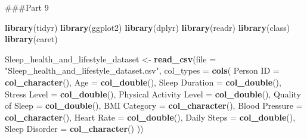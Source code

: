 \documentclass[
  11pt,
]{article}
\newenvironment{Shaded}{\begin{snugshade}}{\end{snugshade}}
\newcommand{\AttributeTok}[1]{\textcolor[rgb]{0.13,0.29,0.53}{#1}}
\newcommand{\FunctionTok}[1]{\textcolor[rgb]{0.13,0.29,0.53}{\textbf{#1}}}
\newcommand{\NormalTok}[1]{#1}
\newcommand{\OtherTok}[1]{\textcolor[rgb]{0.56,0.35,0.01}{#1}}
\newcommand{\StringTok}[1]{\textcolor[rgb]{0.31,0.60,0.02}{#1}}
\begin{document}
\#\#\#Part 9

\begin{Shaded}
\begin{Highlighting}[]
\FunctionTok{library}\NormalTok{(tidyr)}
\FunctionTok{library}\NormalTok{(ggplot2)}
\FunctionTok{library}\NormalTok{(dplyr)}
\FunctionTok{library}\NormalTok{(readr)}
\FunctionTok{library}\NormalTok{(class)}
\FunctionTok{library}\NormalTok{(caret)}

\NormalTok{Sleep\_health\_and\_lifestyle\_dataset }\OtherTok{\textless{}{-}} \FunctionTok{read\_csv}\NormalTok{(}\AttributeTok{file =} \StringTok{"Sleep\_health\_and\_lifestyle\_dataset.csv"}\NormalTok{,}
  \AttributeTok{col\_types =} \FunctionTok{cols}\NormalTok{(}
    \StringTok{\textquotesingle{}Person ID\textquotesingle{}} \OtherTok{=} \FunctionTok{col\_character}\NormalTok{(),}
    \StringTok{\textquotesingle{}Age\textquotesingle{}} \OtherTok{=} \FunctionTok{col\_double}\NormalTok{(),}
    \StringTok{\textquotesingle{}Sleep Duration\textquotesingle{}} \OtherTok{=} \FunctionTok{col\_double}\NormalTok{(),}
    \StringTok{\textquotesingle{}Stress Level\textquotesingle{}} \OtherTok{=} \FunctionTok{col\_double}\NormalTok{(),}
    \StringTok{\textquotesingle{}Physical Activity Level\textquotesingle{}} \OtherTok{=} \FunctionTok{col\_double}\NormalTok{(),}
    \StringTok{\textquotesingle{}Quality of Sleep\textquotesingle{}} \OtherTok{=} \FunctionTok{col\_double}\NormalTok{(),}
    \StringTok{\textquotesingle{}BMI Category\textquotesingle{}} \OtherTok{=} \FunctionTok{col\_character}\NormalTok{(),}
    \StringTok{\textquotesingle{}Blood Pressure\textquotesingle{}} \OtherTok{=} \FunctionTok{col\_character}\NormalTok{(),}
    \StringTok{\textquotesingle{}Heart Rate\textquotesingle{}} \OtherTok{=} \FunctionTok{col\_double}\NormalTok{(),}
    \StringTok{\textquotesingle{}Daily Steps\textquotesingle{}} \OtherTok{=} \FunctionTok{col\_double}\NormalTok{(),}
    \StringTok{\textquotesingle{}Sleep Disorder\textquotesingle{}} \OtherTok{=} \FunctionTok{col\_character}\NormalTok{()}
\NormalTok{  ))}


\end{Highlighting}
\end{Shaded}
\end{document}

